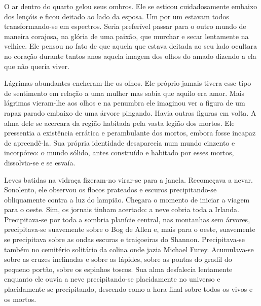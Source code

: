O ar dentro do quarto gelou seus ombros.  Ele se esticou cuidadosamente embaixo
dos lençóis e ficou deitado ao lado da esposa.  Um por um estavam todos
transformando-se em espectros.  Seria preferível passar para o outro mundo de
maneira corajosa, na glória de uma paixão, que murchar e secar lentamente na
velhice.  Ele pensou no fato de que aquela que estava deitada ao seu lado
ocultara no coração durante tantos anos aquela imagem dos olhos do amado
dizendo a ela que não queria viver.

Lágrimas abundantes encheram-lhe os olhos.  Ele próprio jamais tivera esse tipo
de sentimento em relação a uma mulher mas sabia que aquilo era amor.  Mais
lágrimas vieram-lhe aos olhos e na penumbra ele imaginou ver a figura de um
rapaz parado embaixo de uma árvore pingando.  Havia outras figuras em volta.  A
alma dele se acercara da região habitada pela vasta legião dos mortos.  Ele
pressentia a existência errática e perambulante dos mortos, embora fosse
incapaz de apreendê-la.  Sua própria identidade desaparecia num mundo cinzento
e incorpóreo: o mundo sólido, antes construído e habitado por esses mortos,
dissolvia-se e se esvaía.

Leves batidas na vidraça fizeram-no virar-se para a janela.  Recomeçava a
nevar.  Sonolento, ele observou os flocos prateados e escuros precipitando-se
obliquamente contra a luz do lampião.  Chegara o momento de iniciar a viagem
para o oeste.  Sim, os jornais tinham acertado: a neve cobria toda a Irlanda.
Precipitava-se por toda a sombria planície central, nas montanhas sem árvores,
precipitava-se suavemente sobre o Bog de Allen e, mais para o oeste, suavemente
se precipitava sobre as ondas escuras e traiçoeiras do Shannon.  Precipitava-se
também no cemitério solitário da colina onde jazia Michael Furey.  Acumulava-se
sobre as cruzes inclinadas e sobre as lápides, sobre as pontas do gradil do
pequeno portão, sobre os espinhos toscos.  Sua alma desfalecia lentamente
enquanto ele ouvia a neve precipitando-se placidamente no universo e
placidamente se precipitando, descendo como a hora final sobre todos os vivos e
os mortos.

\openright

